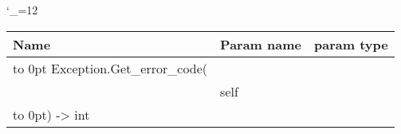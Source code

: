 \begingroup \catcode`\_=12 \tt
\begin{tabular}{lll}
\toprule
\textrm{Name}&\textrm{Param name}&\textrm{param type}\\
\midrule
\hbox to 0pt {Exception.Get_error_code(\hss}\\
& self\\
\hbox to 0pt{) -> int\hss}\\
\bottomrule
\end{tabular}
\endgroup

